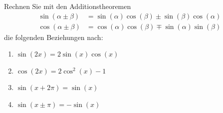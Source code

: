 \begin{ExerciseBlock}
Rechnen Sie mit den Additionstheoremen
\begin{equation*}
	\begin{split}
		\sin(\alpha \pm \beta) &= \sin(\alpha) \cos(\beta) \pm \sin(\beta) \cos(\alpha) \\
		\cos(\alpha \pm \beta) &= \cos(\alpha) \cos(\beta) \mp \sin(\alpha) \sin(\beta)
	\end{split}
\end{equation*}
die folgenden Beziehungen nach:
\begin{enumerate}[label=\alph*)]
	\item $\displaystyle \sin(2x) = 2 \sin(x) \cos(x)$
	\item $\displaystyle \cos(2x) = 2 \cos^2(x) - 1$
	\item $\displaystyle \sin(x + 2 \pi) = \sin(x)$
	\item $\displaystyle \sin(x \pm \pi) = -\sin(x)$
\end{enumerate}

\end{ExerciseBlock}
